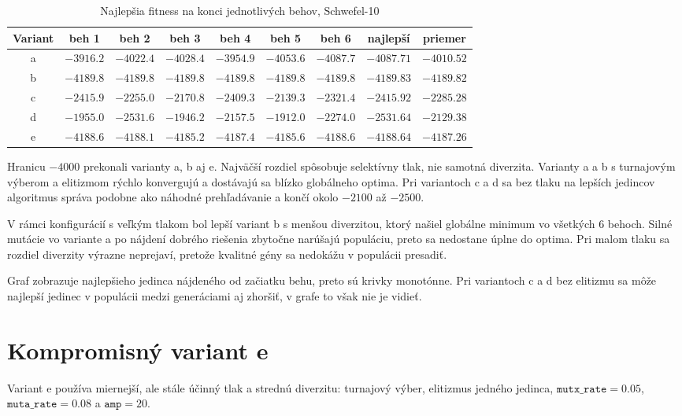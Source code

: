 \documentclass[11pt,a4paper]{article}
\begin{document}
\begin{table}[H]
\centering
\small
\caption{Najlepšia fitness na konci jednotlivých behov, Schwefel-10}
\begin{tabular}{ccccccc|cc}
\toprule
Variant & beh 1 & beh 2 & beh 3 & beh 4 & beh 5 & beh 6 & najlepší & priemer \\
\midrule
a & $-3916.2$ & $-4022.4$ & $-4028.4$ & $-3954.9$ & $-4053.6$ & $-4087.7$ & $-4087.71$ & $-4010.52$ \\
b & $-4189.8$ & $-4189.8$ & $-4189.8$ & $-4189.8$ & $-4189.8$ & $-4189.8$ & $\mathbf{-4189.83}$ & $\mathbf{-4189.82}$ \\
c & $-2415.9$ & $-2255.0$ & $-2170.8$ & $-2409.3$ & $-2139.3$ & $-2321.4$ & $-2415.92$ & $-2285.28$ \\
d & $-1955.0$ & $-2531.6$ & $-1946.2$ & $-2157.5$ & $-1912.0$ & $-2274.0$ & $-2531.64$ & $-2129.38$ \\
e & $-4188.6$ & $-4188.1$ & $-4185.2$ & $-4187.4$ & $-4185.6$ & $-4188.6$ & $-4188.64$ & $-4187.26$ \\
\bottomrule
\end{tabular}
\end{table}

Hranicu $-4000$ prekonali varianty a, b aj e. Najväčší rozdiel spôsobuje
selektívny tlak, nie samotná diverzita. Varianty a a b s turnajovým výberom a
elitizmom rýchlo konvergujú a dostávajú sa blízko globálneho optima. Pri
variantoch c a d sa bez tlaku na lepších jedincov algoritmus správa podobne ako
náhodné prehľadávanie a končí okolo $-2100$ až $-2500$.

V rámci konfigurácií s veľkým tlakom bol lepší variant b s menšou diverzitou,
ktorý našiel globálne minimum vo všetkých 6 behoch. Silné mutácie vo variante a
po nájdení dobrého riešenia zbytočne narúšajú populáciu, preto sa nedostane
úplne do optima. Pri malom tlaku sa rozdiel diverzity výrazne neprejaví, pretože
kvalitné gény sa nedokážu v populácii presadiť.

Graf zobrazuje najlepšieho jedinca nájdeného od začiatku behu, preto sú krivky
monotónne. Pri variantoch c a d bez elitizmu sa môže najlepší jedinec v populácii
medzi generáciami aj zhoršiť, v grafe to však nie je vidieť.

\section{Kompromisný variant e}

Variant e používa miernejší, ale stále účinný tlak a strednú diverzitu:
turnajový výber, elitizmus jedného jedinca, $\texttt{mutx\_rate}=0.05$,
$\texttt{muta\_rate}=0.08$ a $\texttt{amp}=20$.
\end{document}
